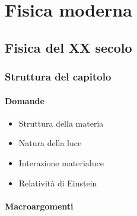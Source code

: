 \documentclass[letterpaper,10pt,italian]{jupyterBook}
\begin{document}
\part{Fisica moderna}

\sphinxstepscope


\chapter{Fisica del XX secolo}
\label{\detokenize{ch/modern:fisica-del-xx-secolo}}\label{\detokenize{ch/modern:physics-hs-modern}}\label{\detokenize{ch/modern::doc}}

\section{Struttura del capitolo}
\label{\detokenize{ch/modern:struttura-del-capitolo}}

\subsection{Domande}
\label{\detokenize{ch/modern:domande}}\begin{itemize}
\item {} 
\sphinxAtStartPar
Struttura della materia

\item {} 
\sphinxAtStartPar
Natura della luce

\item {} 
\sphinxAtStartPar
Interazione materia\sphinxhyphen{}luce

\item {} 
\sphinxAtStartPar
Relatività di Einstein

\end{itemize}


\subsection{Macro\sphinxhyphen{}argomenti}
\label{\detokenize{ch/modern:macro-argomenti}}
\end{document}

